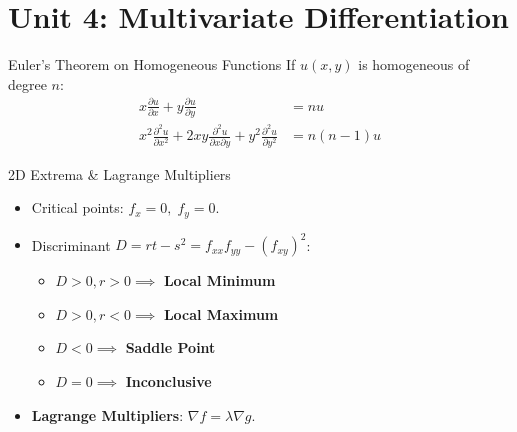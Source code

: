 \chapter{Unit 4: Multivariate Differentiation}

\begin{formulabox}{Euler's Theorem on Homogeneous Functions}
If $u(x,y)$ is homogeneous of degree $n$:
\begin{align}
x \frac{\partial u}{\partial x} + y \frac{\partial u}{\partial y} &= n u \\
x^2 \frac{\partial^2 u}{\partial x^2} + 2xy \frac{\partial^2 u}{\partial x \partial y} + y^2 \frac{\partial^2 u}{\partial y^2} &= n(n-1)u
\end{align}
\end{formulabox}

\begin{formulabox}{2D Extrema \& Lagrange Multipliers}
\begin{itemize}[leftmargin=1.5em]
    \item Critical points: $f_x = 0, \; f_y = 0$.
    \item Discriminant $D = r t - s^2 = f_{xx} f_{yy} - (f_{xy})^2$:
    \begin{itemize}
        \item $D > 0, r > 0 \implies$ \textbf{Local Minimum}
        \item $D > 0, r < 0 \implies$ \textbf{Local Maximum}
        \item $D < 0 \implies$ \textbf{Saddle Point}
        \item $D = 0 \implies$ \textbf{Inconclusive}
    \end{itemize}
    \item \textbf{Lagrange Multipliers}: $\nabla f = \lambda \nabla g$.
\end{itemize}
\end{formulabox}
